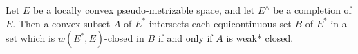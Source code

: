 Let $E$ be a locally convex pseudo-metrizable space, and let $E^\wedge$ be a completion of $E$. Then a convex subset $A$ of $E^*$ intersects each equicontinuous set $B$ of $E^*$ in a set which is $w(E^*, E)$-closed in $B$ if and only if $A$ is weak* closed.
